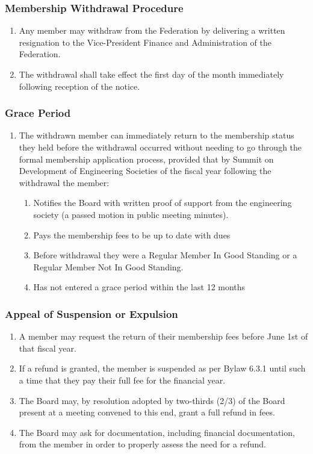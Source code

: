 \subsubsection{Membership Withdrawal Procedure}
\label{membership-withdrawal-procedure}

\begin{enumerate}
 \item
  Any member may withdraw from the Federation by delivering a written resignation to the Vice-President Finance and Administration of the Federation.
 \item
  The withdrawal shall take effect the first day of the month immediately following reception of the notice.
\end{enumerate}

\subsubsection{Grace Period}
\label{grace-period}

\begin{enumerate}
 \item
  The withdrawn member can immediately return to the membership status they held before the withdrawal occurred without needing to go through the formal membership application process, provided that by Summit on Development of Engineering Societies of the fiscal year following the withdrawal the member:
  \begin{enumerate}
   \item
    Notifies the Board with written proof of support from the engineering society (a passed motion in public meeting minutes).
   \item
    Pays the membership fees to be up to date with dues
   \item
    Before withdrawal they were a Regular Member In Good Standing or a Regular Member Not In Good Standing.
   \item
    Has not entered a grace period within the last 12 months
  \end{enumerate}
\end{enumerate}

\subsubsection{Appeal of Suspension or Expulsion}
\label{appeal-of-suspension-or-expulsion}

\begin{enumerate}
 \item
  A member may request the return of their membership fees before June 1st of that fiscal year.
 \item
  If a refund is granted, the member is suspended as per Bylaw 6.3.1 until such a time that they pay their full fee for the financial year.
 \item
  The Board may, by resolution adopted by two-thirds (2/3) of the Board present at a meeting convened to this end, grant a full refund in fees.
 \item
  The Board may ask for documentation, including financial documentation, from the member in order to properly assess the need for a refund.
\end{enumerate}

